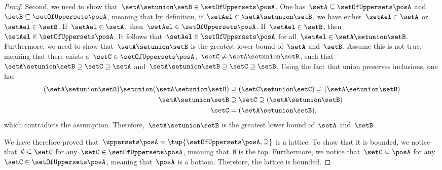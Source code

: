 \begin{proof}
		Second, we need to show that~$\setA\setunion \setB\in \setOfUppersets \posA$.
		One has~$\setA\subseteq \setOfUppersets \posA$ and~$\setB \subseteq \setOfUppersets \posA$, meaning that by definition, if~$\setAel\in \setA\setunion \setB$, we have either~$\setAel\in \setA$ or~$\setAel\in \setB$.
		If~$\setAel\in \setA$, then~$\setAel\in \setOfUppersets \posA$.
		If~$\setAel\in \setB$, then~$\setAel \in \setOfUppersets \posA$.
		It follows that~$\setAel \in \setOfUppersets \posA$ for all~$\setAel\in \setA\setunion \setB$.
		Furthermore, we need to show that~$\setA\setunion \setB$ is the greatest lower bound of~$\setA$ and~$\setB$.
		Assume this is not true, meaning that there exists a~$\setC\in \setOfUppersets \posA$,~$\setC\neq \setA\setunion \setB$, such that~$\setA\setunion \setB\supseteq \setC\supseteq \setA$ and~$\setA\setunion \setB\supseteq \setC\supseteq \setB$.
		Using the fact that union preserves inclusions, one has
		\begin{equation}
			\begin{aligned}
				(\setA\setunion \setB)
				\setunion (\setA\setunion \setB) & \supseteq (\setC \setunion \setC) \supseteq (\setA\setunion \setB) \\
				\setA\setunion \setB             & \supseteq \setC\supseteq (\setA\setunion \setB )                   \\
				\setC                            & =(\setA\setunion \setB),
			\end{aligned}
		\end{equation}
		which contradicts the assumption.
		Therefore,~$\setA\setunion \setB$ is the greatest lower bound of~$\setA$ and~$\setB$.

		We have therefore proved that~$\uppersets \posA=\tup{\setOfUppersets \posA,\supseteq}$ is a lattice.
		To show that it is bounded, we notice that~$\emptyset \subseteq \setC$ for any~$\setC\in \setOfUppersets \posA$, meaning that~$\emptyset$ is the top.
		Furthermore, we notice that~$\setC\subseteq \posA$ for any~$\setC\in \setOfUppersets \posA$, meaning that~$\posA$ is a bottom.
	Therefore, the lattice is bounded.
\end{proof}

